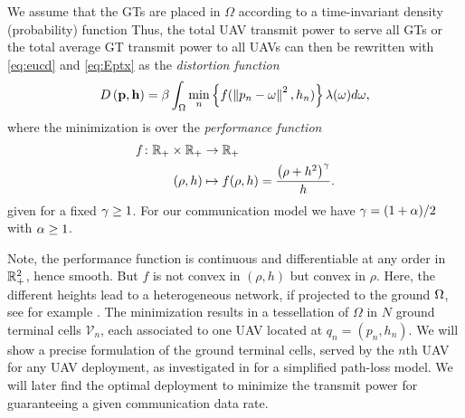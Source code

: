 \documentclass[smallabstract,smallcaptions]{dccpaper}
\newcounter{example}[section]
\newcommand{\df}{\ensuremath{\lam}}         %
\newcommand{\bP}{\ensuremath{\vp}}          %
\newcommand{\bH}{\ensuremath{\vh}}          %
\newcommand{\Vor}{\ensuremath{\mathcal{V}}}         %
\begin{document}
We assume that the GTs  are placed in $\Omega$ according to a time-invariant density (probability) function
  Thus, the total
UAV transmit power to serve all GTs or the total average GT transmit power to all UAVs can then be rewritten with
\eqref{eq:eucd} and \eqref{eq:Eptx} as the \emph{distortion function}
%
\begin{equation}
  D\left(\bP,\bH\right)=\bet\int_{\Omega}\min_{n} \left\{ f(\Norm{p_n-\ome}^2,h_n) \right\} \df(\omega)d\omega,
 \label{obj0}
\end{equation}
%
where the minimization is over the \emph{performance function}
%
\begin{align}
 f \colon {\ensuremath{\mathbb R}}_+\times {\ensuremath{\mathbb R}}_+ &\to {\ensuremath{\mathbb R}}_+\\
           (\rho,h)&\mapsto f(\rho,h)=\frac{\left(\rho+h^2\right)^{\gamma}}{h}.
\end{align}
%
given for a fixed $\gamma\geq 1$. For our communication model we have $\gamma=(1+\alpha)/2$ with $\alpha\geq 1$.

Note, the performance function is continuous and differentiable at any order in ${\mathbb R}^2_+$, hence smooth. But $f$ is not
convex in $(\rho,h)$ but convex in $\rho$. 
Here, the different heights lead to a heterogeneous network, if projected to the ground $\Omega$, see for example
\cite{GJ16a}.  The minimization results in a tessellation of $\Omega$ in $N$ ground terminal cells $\Vor_n$, each
associated to one UAV located at $q_n=(p_n,h_n)$.  We will show a precise formulation of the ground terminal cells,
served by the $n$th UAV for any UAV deployment, as investigated in \cite{MSBD16b} for a simplified path-loss model. We
will later find the optimal deployment to minimize the transmit power for guaranteeing a given communication data rate.
%
\fi
\end{document}
